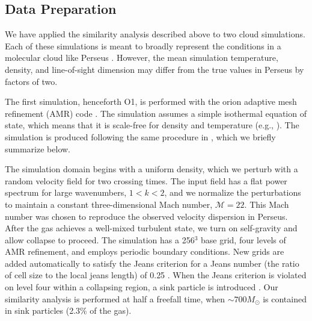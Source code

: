 \subsection{Data Preparation}
\label{sec:sim}

We have applied the similarity analysis described above to two cloud simulations. Each of these simulations is meant to broadly represent the
conditions in a molecular cloud like Perseus \citep{http://adsabs.harvard.edu/abs/2006AJ....131.2921R, http://adsabs.harvard.edu/abs/2008hsf1.book..308B}. However, the mean simulation temperature, density, and line-of-sight dimension may differ from the true values in Perseus by factors of two.


The first simulation, henceforth O1, is performed with the {\sc orion} adaptive mesh refinement
(AMR) code \citep{http://adsabs.harvard.edu/abs/1998ApJ...495..821T, http://adsabs.harvard.edu/abs/1999JCoAM.109..123K}. The simulation assumes a simple isothermal equation
of state, which means that it is scale-free for density and temperature (e.g., \citealt{http://adsabs.harvard.edu/abs/2008ApJ...686.1174O}). The simulation is produced following the same procedure in
\citet{Offner13}, which we briefly summarize below.

The simulation domain begins with a uniform density, which we perturb with
a random velocity field for two crossing times. The input field has a
flat power spectrum for large wavenumbers, $1<k<2$, and we normalize the perturbations to maintain a constant
three-dimensional Mach number, $\mathcal{M}=22$. This Mach number was chosen to reproduce the observed velocity dispersion in Perseus. After the gas achieves a well-mixed turbulent state, we turn on
self-gravity and allow collapse to proceed. The simulation has a 256$^3$
base grid, four levels of AMR refinement, and employs periodic boundary conditions. New grids are added automatically to satisfy the Jeans
criterion for a Jeans number (the ratio of cell size to the local jeans length) of 0.25 \citep{http://adsabs.harvard.edu/abs/1997ApJ...489L.179T}. When the
Jeans criterion is violated on level four within a collapsing region, a sink particle is introduced \citep{http://adsabs.harvard.edu/abs/2004ApJ...611..399K}.  Our similarity analysis is performed at half a freefall time, when $\sim 700 M_\odot$ is contained in sink particles (2.3\% of the gas).

